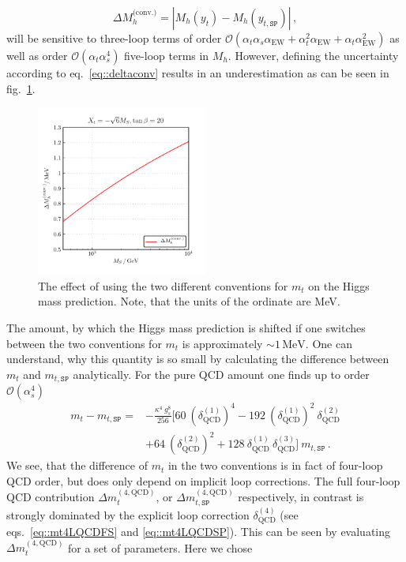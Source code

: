 \documentclass[a4paper,12pt]{book}
\begin{document}
\begin{equation}
\label{eq::deltaconv}
\Delta M_h^\text{(conv.)}=|M_h(y_t)-M_h(y_{t,\texttt{SP}})|\,, 
\end{equation}
will be sensitive to three-loop terms of order $\mathcal{O}(\alpha_t\alpha_s\alpha_\text{EW}+\alpha_t^2 \alpha_\text{EW}+\alpha_t\alpha_\text{EW}^2)$ as well as order $\mathcal{O}(\alpha_t\alpha_s^4)$ five-loop terms in $M_h$. However, defining the uncertainty according to eq.\ \eqref{eq::deltaconv} results in an underestimation as can be seen in fig.\ \ref{fig::DMhconv}.
\begin{figure}[h]
\begin{center}
\includegraphics[width=0.5\textwidth]{src/img/DMhconv_MS.pdf}
\caption{The effect of using the two different conventions for $m_t$ on the Higgs mass prediction. Note, that the units of the ordinate are MeV.}
\label{fig::DMhconv}
\end{center}
\end{figure}
The amount, by which the Higgs mass prediction is shifted if one switches between the two conventions for $m_t$ is approximately $\sim 1\, \mathrm{MeV}$. One can understand, why this quantity is so small by calculating the difference between $m_t$ and $m_{t,\texttt{SP}}$ analytically. For the pure QCD amount one finds up to order $\mathcal{O}(\alpha_s^4)$
\begin{align}
\nonumber
m_t-m_{t,\texttt{SP}} =& -\frac{\kappa^4 \> g_s^8}{256}\biggl[60\>\left(\delta^{(1)}_\text{QCD}\right)^4-192\> \left(\delta^{(1)}_\text{QCD}\right)^2 \> \delta^{(2)}_\text{QCD}\\
&+64\>\left(\delta^{(2)}_\text{QCD}\right)^2+128\> \delta^{(1)}_\text{QCD} \> \delta^{(3)}_\text{QCD}\biggr]\> m_{t,\texttt{SP}}\,.
\end{align} 
We see, that the difference of $m_t$ in the two conventions is in fact of four-loop QCD order, but does only depend on implicit loop corrections. The full four-loop QCD contribution $\Delta m_t^{(4,\text{QCD})}$, or $\Delta m_{t,\texttt{SP}}^{(4,\text{QCD})}$ respectively, in contrast is strongly dominated by the explicit loop correction $\delta^{(4)}_\text{QCD}$ (see eqs.\ \eqref{eq::mt4LQCDFS} and \eqref{eq::mt4LQCDSP}). This can be seen by evaluating $\Delta m_t^{(4,\text{QCD})}$ for a set of parameters. Here we chose 
\end{document}

